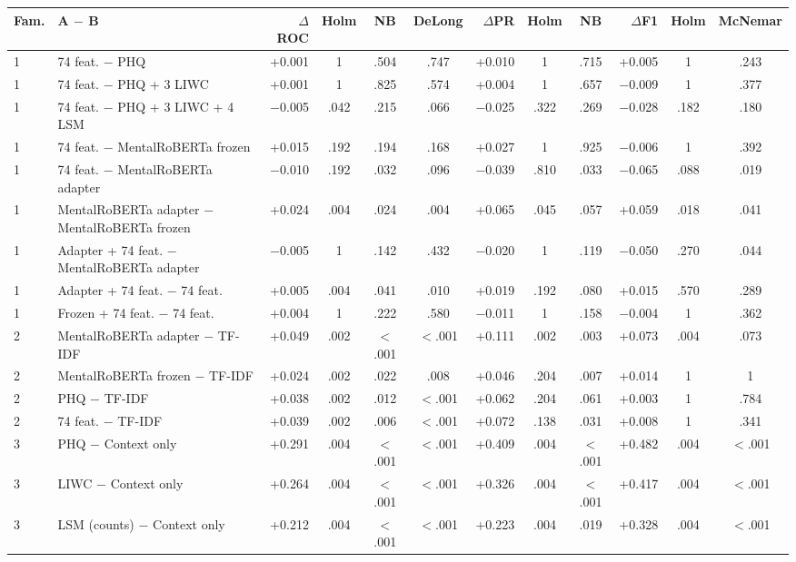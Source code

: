 \begin{tabular}{llrcccrccrcc}
\toprule
Fam. & A $-$ B & $\Delta$ROC & Holm & NB & DeLong & $\Delta$PR & Holm & NB & $\Delta$F1 & Holm & McNemar \\
\midrule
1 & 74 feat. $-$ PHQ & +0.001 & 1 & .504 & .747 & +0.010 & 1 & .715 & +0.005 & 1 & .243 \\
1 & 74 feat. $-$ PHQ + 3 LIWC & +0.001 & 1 & .825 & .574 & +0.004 & 1 & .657 & $-$0.009 & 1 & .377 \\
1 & 74 feat. $-$ PHQ + 3 LIWC + 4 LSM & $-$0.005 & .042 & .215 & .066 & $-$0.025 & .322 & .269 & $-$0.028 & .182 & .180 \\
1 & 74 feat. $-$ MentalRoBERTa frozen & +0.015 & .192 & .194 & .168 & +0.027 & 1 & .925 & $-$0.006 & 1 & .392 \\
1 & 74 feat. $-$ MentalRoBERTa adapter & $-$0.010 & .192 & .032 & .096 & $-$0.039 & .810 & .033 & $-$0.065 & .088 & .019 \\
1 & MentalRoBERTa adapter $-$ MentalRoBERTa frozen & +0.024 & .004 & .024 & .004 & +0.065 & .045 & .057 & +0.059 & .018 & .041 \\
1 & Adapter + 74 feat. $-$ MentalRoBERTa adapter & $-$0.005 & 1 & .142 & .432 & $-$0.020 & 1 & .119 & $-$0.050 & .270 & .044 \\
1 & Adapter + 74 feat. $-$ 74 feat. & +0.005 & .004 & .041 & .010 & +0.019 & .192 & .080 & +0.015 & .570 & .289 \\
1 & Frozen + 74 feat. $-$ 74 feat. & +0.004 & 1 & .222 & .580 & $-$0.011 & 1 & .158 & $-$0.004 & 1 & .362 \\
2 & MentalRoBERTa adapter $-$ TF-IDF & +0.049 & .002 & $<$.001 & $<$.001 & +0.111 & .002 & .003 & +0.073 & .004 & .073 \\
2 & MentalRoBERTa frozen $-$ TF-IDF & +0.024 & .002 & .022 & .008 & +0.046 & .204 & .007 & +0.014 & 1 & 1 \\
2 & PHQ $-$ TF-IDF & +0.038 & .002 & .012 & $<$.001 & +0.062 & .204 & .061 & +0.003 & 1 & .784 \\
2 & 74 feat. $-$ TF-IDF & +0.039 & .002 & .006 & $<$.001 & +0.072 & .138 & .031 & +0.008 & 1 & .341 \\
3 & PHQ $-$ Context only & +0.291 & .004 & $<$.001 & $<$.001 & +0.409 & .004 & $<$.001 & +0.482 & .004 & $<$.001 \\
3 & LIWC $-$ Context only & +0.264 & .004 & $<$.001 & $<$.001 & +0.326 & .004 & $<$.001 & +0.417 & .004 & $<$.001 \\
3 & LSM (counts) $-$ Context only & +0.212 & .004 & $<$.001 & $<$.001 & +0.223 & .004 & .019 & +0.328 & .004 & $<$.001 \\

\end{tabular}
